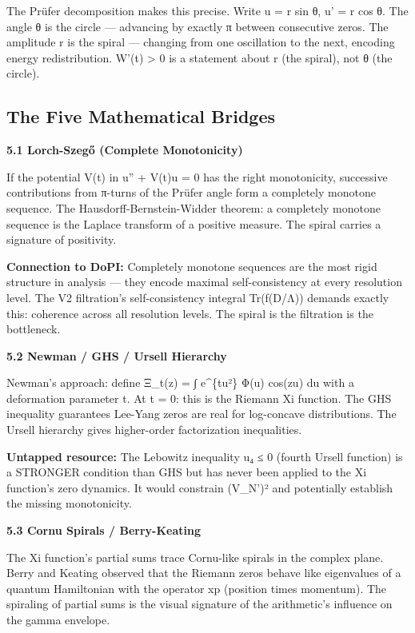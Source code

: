 The Prüfer decomposition makes this precise. Write u = r sin θ, u' = r cos θ. The angle θ is the circle — advancing by exactly π between consecutive zeros. The amplitude r is the spiral — changing from one oscillation to the next, encoding energy redistribution. W'(t) > 0 is a statement about r (the spiral), not θ (the circle).


\subsection*{The Five Mathematical Bridges}


\textbf{5.1 Lorch-Szegő (Complete Monotonicity)}


If the potential V(t) in u'' + V(t)u = 0 has the right monotonicity, successive contributions from π-turns of the Prüfer angle form a completely monotone sequence. The Hausdorff-Bernstein-Widder theorem: a completely monotone sequence is the Laplace transform of a positive measure. The spiral carries a signature of positivity.


\textbf{Connection to DoPI:} Completely monotone sequences are the most rigid structure in analysis — they encode maximal self-consistency at every resolution level. The V2 filtration's self-consistency integral Tr(f(D/Λ)) demands exactly this: coherence across all resolution levels. The spiral is the filtration is the bottleneck.


\textbf{5.2 Newman / GHS / Ursell Hierarchy}


Newman's approach: define Ξ\_t(z) = ∫ e\textasciicircum{}\{tu²\} Φ(u) cos(zu) du with a deformation parameter t. At t = 0: this is the Riemann Xi function. The GHS inequality guarantees Lee-Yang zeros are real for log-concave distributions. The Ursell hierarchy gives higher-order factorization inequalities.


\textbf{Untapped resource:} The Lebowitz inequality u₄ ≤ 0 (fourth Ursell function) is a STRONGER condition than GHS but has never been applied to the Xi function's zero dynamics. It would constrain (V\_N')² and potentially establish the missing monotonicity.


\textbf{5.3 Cornu Spirals / Berry-Keating}


The Xi function's partial sums trace Cornu-like spirals in the complex plane. Berry and Keating observed that the Riemann zeros behave like eigenvalues of a quantum Hamiltonian with the operator xp (position times momentum). The spiraling of partial sums is the visual signature of the arithmetic's influence on the gamma envelope.


